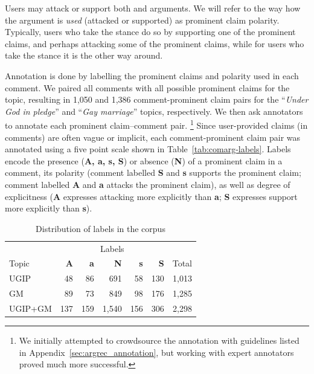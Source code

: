 Users may attack or support both  and  arguments. 
We will refer to the way how the argument is \textit{used} (attacked or supported)
as prominent claim polarity. 
Typically, users who take the  stance do so by supporting one of the 
prominent claims, and perhaps attacking some of the  prominent claims, while
for users who take the  stance it is the other way around. 


Annotation is done by labelling the prominent claims and polarity  
used in each comment. 
We paired all comments with all possible prominent claims for the topic, resulting in
1,050 and 1,386 comment-prominent claim pairs for the ``\emph{Under God
in pledge}'' and ``\emph{Gay marriage}'' topics, respectively. 
We then ask annotators to annotate each prominent claim--comment 
pair. \footnote{
We 
initially attempted to crowdsource the annotation with guidelines listed in 
Appendix~\ref{sec:argrec_annotation}, but working with expert annotators 
proved much more successful. }
Since user-provided claims (in comments) are often vague or implicit, 
each comment-prominent claim pair was annotated using a five point scale shown in 
Table~\ref{tab:comarg-labels}. Labels encode the presence (\textbf{A, a, s, S})
or absence (\textbf{N}) of a prominent claim in a comment, its polarity
(comment labelled \textbf{S} and \textbf{s} supports the prominent claim; comment labelled
\textbf{A} and \textbf{a} attacks the prominent claim),
as well as degree of 
explicitness (\textbf{A} expresses attacking more explicitly than \textbf{a};
\textbf{S} expresses support
more explicitly than \textbf{s}). 

\begin{table}
\centering
{\small
\begin{tabular}{lrrrrrr}
\toprule
& \multicolumn{5}{c}{Labels}\\
\cmidrule(lr){2-6}
Topic & \textbf{A} & \textbf{a} & \textbf{N} & \textbf{s} & \textbf{S} & Total \\
\midrule
UGIP         & 48  & 86 & 691 & 58 & 130 & 1,013 \\
GM           & 89 & 73 & 849 & 98 & 176 & 1,285 \\
UGIP+GM      & 137 & 159 &1,540 & 156& 306 & 2,298 \\
\bottomrule
\end{tabular}
}
\caption{Distribution of labels in the \ComArg corpus}
\label{tab:labels}
\end{table}

